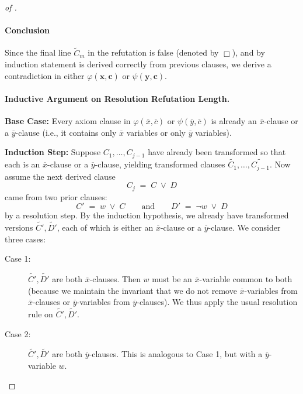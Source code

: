 \begin{proof}[of ]
\paragraph{Conclusion}
Since the final line \(\widetilde C_m\) in the refutation is false (denoted by \(\Box\)), and by induction statement is derived correctly from previous clauses, we derive a contradiction in either \(\varphi(\mathbf{x}, \mathbf{c})\) or \(\psi(\mathbf{y}, \mathbf{c})\). 







\paragraph{Inductive Argument on Resolution Refutation Length.}

\noindent
\textbf{Base Case:} 
Every axiom clause in \(\varphi(\overline{x}, \overline{c})\) or \(\psi(\overline{y}, \overline{c})\) is already an \(\overline{x}\)-clause or a \(\overline{y}\)-clause (i.e., it contains only \(\overline{x}\) variables or only \(\overline{y}\) variables).

\medskip

\noindent
\textbf{Induction Step:} 
Suppose \(C_1, \dots, C_{j-1}\) have already been transformed so that each is an \(\overline{x}\)-clause or a \(\overline{y}\)-clause, yielding transformed clauses \(\widetilde{C_1}, \dots, \widetilde{C_{j-1}}\). Now assume the next derived clause 
\[
C_j \;=\; C \;\lor\; D
\]
came from two prior clauses:
\[
C' \;=\; w \;\lor\; C
\quad\quad\text{and}\quad\quad
D' \;=\; \neg w \;\lor\; D
\]
by a resolution step.
By the induction hypothesis, we already have transformed versions \(\widetilde{C'}, \widetilde{D'}\), each of which is either an \(\overline{x}\)-clause or a \(\overline{y}\)-clause. We consider three cases:

\begin{description}
\item[Case 1:] 
\(\widetilde{C'}, \widetilde{D'}\) are both \(\overline{x}\)-clauses. Then \(w\) must be an \(\overline{x}\)-variable common to both (because we maintain the invariant that we do not remove $\overline x$-variables from $\overline x$-clauses or $\overline y$-variables from $\overline y$-clauses). We thus apply the usual resolution rule on \(\widetilde{C'}, \widetilde{D'}\).

\item[Case 2:]
\(\widetilde{C'}, \widetilde{D'}\) are both \(\overline{y}\)-clauses. This is analogous to Case 1, but with a \(\overline{y}\)-variable \(w\).


\end{description}
\end{proof}

